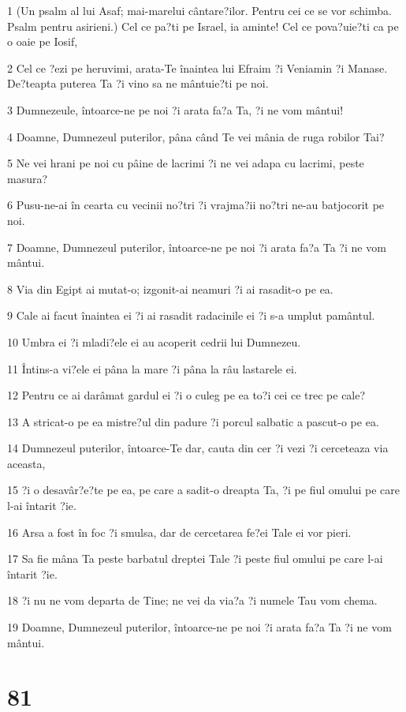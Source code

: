 \par 1 (Un psalm al lui Asaf; mai-marelui cântare?ilor. Pentru cei ce se vor schimba. Psalm pentru asirieni.) Cel ce pa?ti pe Israel, ia aminte! Cel ce pova?uie?ti ca pe o oaie pe Iosif,
\par 2 Cel ce ?ezi pe heruvimi, arata-Te înaintea lui Efraim ?i Veniamin ?i Manase. De?teapta puterea Ta ?i vino sa ne mântuie?ti pe noi.
\par 3 Dumnezeule, întoarce-ne pe noi ?i arata fa?a Ta, ?i ne vom mântui!
\par 4 Doamne, Dumnezeul puterilor, pâna când Te vei mânia de ruga robilor Tai?
\par 5 Ne vei hrani pe noi cu pâine de lacrimi ?i ne vei adapa cu lacrimi, peste masura?
\par 6 Pusu-ne-ai în cearta cu vecinii no?tri ?i vrajma?ii no?tri ne-au batjocorit pe noi.
\par 7 Doamne, Dumnezeul puterilor, întoarce-ne pe noi ?i arata fa?a Ta ?i ne vom mântui.
\par 8 Via din Egipt ai mutat-o; izgonit-ai neamuri ?i ai rasadit-o pe ea.
\par 9 Cale ai facut înaintea ei ?i ai rasadit radacinile ei ?i s-a umplut pamântul.
\par 10 Umbra ei ?i mladi?ele ei au acoperit cedrii lui Dumnezeu.
\par 11 Întins-a vi?ele ei pâna la mare ?i pâna la râu lastarele ei.
\par 12 Pentru ce ai darâmat gardul ei ?i o culeg pe ea to?i cei ce trec pe cale?
\par 13 A stricat-o pe ea mistre?ul din padure ?i porcul salbatic a pascut-o pe ea.
\par 14 Dumnezeul puterilor, întoarce-Te dar, cauta din cer ?i vezi ?i cerceteaza via aceasta,
\par 15 ?i o desavâr?e?te pe ea, pe care a sadit-o dreapta Ta, ?i pe fiul omului pe care l-ai întarit ?ie.
\par 16 Arsa a fost în foc ?i smulsa, dar de cercetarea fe?ei Tale ei vor pieri.
\par 17 Sa fie mâna Ta peste barbatul dreptei Tale ?i peste fiul omului pe care l-ai întarit ?ie.
\par 18 ?i nu ne vom departa de Tine; ne vei da via?a ?i numele Tau vom chema.
\par 19 Doamne, Dumnezeul puterilor, întoarce-ne pe noi ?i arata fa?a Ta ?i ne vom mântui.

\chapter{81}

